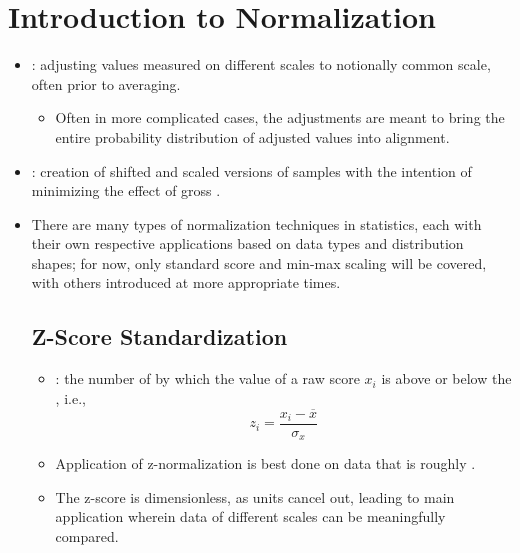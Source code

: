 \section{Introduction to Normalization}
\begin{itemize}
  \item {}: adjusting values measured on different scales to notionally common scale, often prior to averaging.
    \begin{itemize}
      \item Often in more complicated cases, the adjustments are meant to bring the entire probability distribution of adjusted values into alignment.
    \end{itemize}
  \item {}: creation of shifted and scaled versions of samples with the intention of minimizing the effect of gross \hyperref[Subsection: Outliers]{}.
  \item There are many types of normalization techniques in statistics, each with their own respective applications based on data types and distribution shapes; for now, only standard score and min-max scaling will be covered, with others introduced at more appropriate times.

  \subsection{Z-Score Standardization}
  \begin{itemize}
    \item {}: the number of \hyperref[Subsection: Measures of Dispersion]{} by which the value of a raw score \(x_i\) is above or below the \hyperref[Subsection: Measures of Central Tendency]{}, i.e., 
    \[%
    z_i = \frac{x_i - \overline{x}}{\sigma_x}
    \]%
    \item Application of z-normalization is best done on data that is roughly \hyperref[Subsection: Primer: Probability Distributions]{}. 
    \item The z-score is dimensionless, as units cancel out, leading to main application wherein data of different scales can be meaningfully compared. 
  \end{itemize}


\end{itemize}
